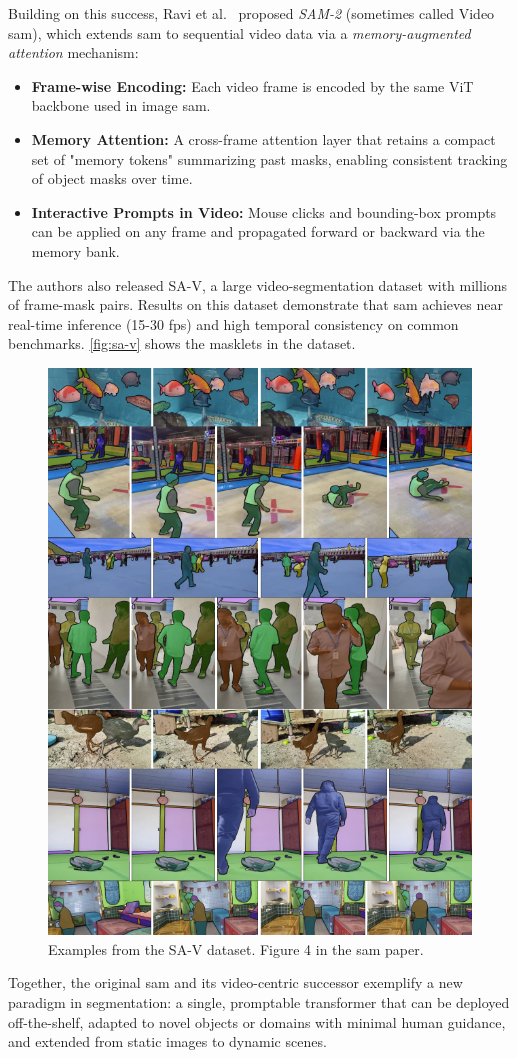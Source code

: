 Building on this success, Ravi et al.\ \cite{ravi_sam_nodate} proposed \emph{SAM-2} (sometimes called Video \acrshort{sam}), which extends \acrshort{sam} to sequential video data via a \emph{memory-augmented attention} mechanism:
\begin{itemize}
    \item \textbf{Frame-wise Encoding:} Each video frame is encoded by the same ViT backbone used in image \acrshort{sam}.
    \item \textbf{Memory Attention:} A cross-frame attention layer that retains a compact set of "memory tokens" summarizing past masks, enabling consistent tracking of object masks over time.
    \item \textbf{Interactive Prompts in Video:} Mouse clicks and bounding-box prompts can be applied on any frame and propagated forward or backward via the memory bank.
\end{itemize}
The authors also released SA-V, a large video-segmentation dataset with millions of frame-mask pairs. Results on this dataset demonstrate that \acrshort{sam} achieves near real-time inference (15-30 fps) and high temporal consistency on common benchmarks. \autoref{fig:sa-v} shows the masklets in the dataset. 
\begin{figure}
    \centering
    \includegraphics[width=0.5\linewidth]{figures/sam_2.png}
    \caption{Examples from the SA-V dataset. Figure 4 in the \acrshort{sam} paper\cite{ravi_sam_nodate}.}
    \label{fig:sa-v}
\end{figure}

Together, the original \acrshort{sam} and its video-centric successor exemplify a new paradigm in segmentation: a single, promptable transformer that can be deployed off-the-shelf, adapted to novel objects or domains with minimal human guidance, and extended from static images to dynamic scenes. 

